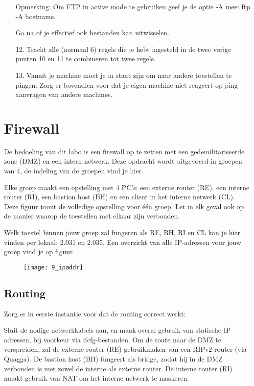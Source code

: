 \documentclass{report}
\begin{document}
\begin{enumerate}
    Opmerking: Om FTP in active mode te gebruiken geef je de optie -A mee: ftp -A hostname.

    Ga na of je effectief ook bestanden kan uitwisselen.
	\item[12.]     Tracht alle (normaal 6) regels die je hebt ingesteld in de twee vorige punten 10 en 11 te combineren tot twee regels.

	\item[13.]    Vanuit je machine moet je in staat zijn om naar andere toestellen te pingen. Zorg er bovendien voor dat je eigen machine niet reageert op ping-aanvragen van andere machines.
\end{enumerate}




\chapter{Firewall}
De bedoeling van dit labo is een firewall op te zetten met een gedemilitariseerde zone (DMZ) en een intern netwerk.
Deze opdracht wordt uitgevoerd in groepen van 4, de indeling van de groepen vind je hier.

Elke groep maakt een opstelling met 4 PC's: een externe router (RE), een interne router (RI), een bastion host (BH) en een client in het interne netwerk (CL).
Deze figuur toont de volledige opstelling voor één groep.
Let in elk geval ook op de manier waarop de toestellen met elkaar zijn verbonden.

Welk toestel binnen jouw groep zal fungeren als RE, BH, RI en CL kan je hier vinden per lokaal: 2.031 en 2.035.
Een overzicht van alle IP-adressen voor jouw groep vind je op figuur 
\begin{figure}
	\texttt{[image: 9\_ipaddr]}
\end{figure}
\section{Routing}

Zorg er in eerste instantie voor dat de routing correct werkt:

    Sluit de nodige netwerkkabels aan, en maak overal gebruik van statische IP-adressen, bij voorkeur via ifcfg-bestanden.
    Om de route naar de DMZ te verspreiden, zal de externe router (RE) gebruikmaken van een RIPv2-router (via Quagga).
    De bastion host (BH) fungeert als bridge, zodat hij in de DMZ verbonden is met zowel de interne als externe router.
    De interne router (RI) maakt gebruik van NAT om het interne netwerk te maskeren.
\end{document}
